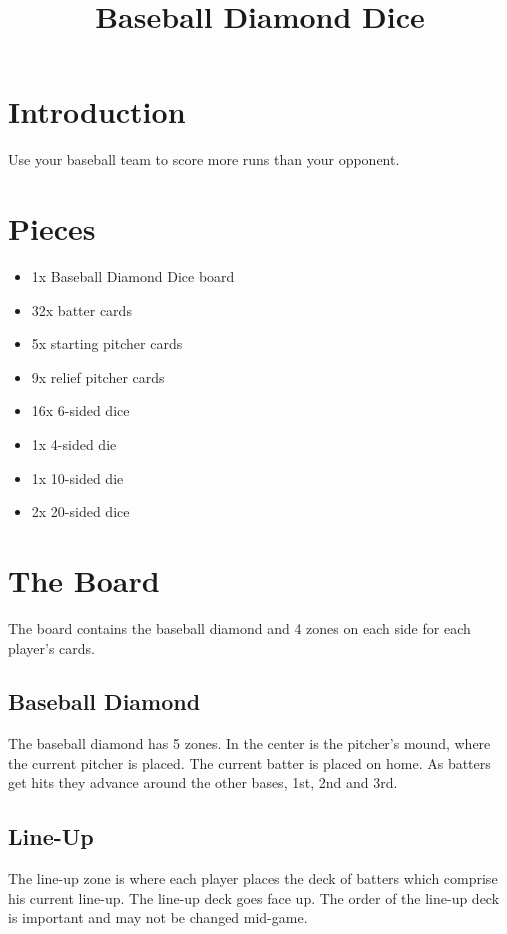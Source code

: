 \documentclass[12pt]{article} %
\date{}
\begin{document}
\title{Baseball Diamond Dice}
\maketitle

\section{Introduction}

Use your baseball team to score more runs than your opponent.

\section{Pieces}

\begin{itemize}
	\item 1x Baseball Diamond Dice board
	\item 32x batter cards
	\item 5x starting pitcher cards
	\item 9x relief pitcher cards
	\item 16x 6-sided dice
	\item 1x 4-sided die
	\item 1x 10-sided die
	\item 2x 20-sided dice
\end{itemize}

\section{The Board}

The board contains the baseball diamond and 4 zones on each side for each player's cards.

\subsection{Baseball Diamond}

The baseball diamond has 5 zones.  In the center is the pitcher's mound, where the current pitcher is placed.  The current batter is placed on home.  As batters get hits they advance around the other bases, 1st, 2nd and 3rd.

\subsection{Line-Up}

The line-up zone is where each player places the deck of batters which comprise his current line-up.  The line-up deck goes face up.  The order of the line-up deck is important and may not be changed mid-game.
\end{document}
